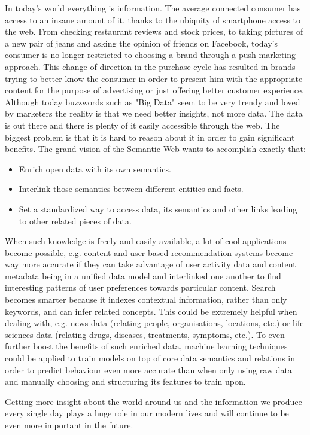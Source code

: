 In today's world everything is information. The average connected consumer has access to an insane amount of it, thanks to the ubiquity of smartphone access to the web. From checking restaurant reviews and stock prices, to taking pictures of a new pair of jeans and asking the opinion of friends on Facebook, today's consumer is no longer restricted to choosing a brand through a push marketing approach. This change of direction in the purchase cycle has resulted in brands trying to better know the consumer in order to present him with the appropriate content for the purpose of advertising or just offering better customer experience. Although today buzzwords such as "Big Data" seem to be very trendy and loved by marketers the reality is that we need better insights, not more data. The data is out there and there is plenty of it easily accessible through the web. The biggest problem is that it is hard to reason about it in order to gain significant benefits. The grand vision of the Semantic Web wants to accomplish exactly that:
\begin{itemize}
    \item Enrich open data with its own semantics.
    \item Interlink those semantics between different entities and facts.
    \item Set a standardized way to access data, its semantics and other links leading to other related pieces of data.
\end{itemize}
When such knowledge is freely and easily available, a lot of cool applications become possible, e.g. content and user based recommendation systems become way more accurate if they can take advantage of user activity data and content metadata being in a unified data model and interlinked one another to find interesting patterns of user preferences towards particular content. Search becomes smarter because it indexes contextual information, rather than only keywords, and can infer related concepts. This could be extremely helpful when dealing with, e.g. news data (relating people, organisations, locations, etc.) or life sciences data (relating drugs, diseases, treatments, symptoms, etc.). To even further boost the benefits of such enriched data, machine learning techniques could be applied to train models on top of core data semantics and relations in order to predict behaviour even more accurate than when only using raw data and manually choosing and structuring its features to train upon. 

Getting more insight about the world around us and the information we produce every single day plays a huge role in our modern lives and will continue to be even more important in the future.

